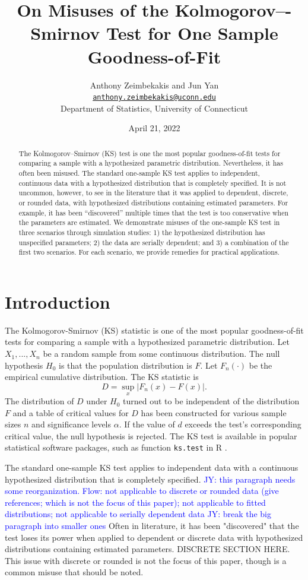 \documentclass[12pt, letterpaper, titlepage]{article}
\title{On Misuses of the Kolmogorov–-Smirnov Test for One Sample Goodness-of-Fit}
\author{Anthony Zeimbekakis and Jun Yan\\
\href{mailto:anthony.zeimbekakis@uconn.edu}{\nolinkurl{anthony.zeimbekakis@uconn.edu}}\\
Department of Statistics, University of Connecticut}
\date{April 21, 2022}
\newcommand{\jy}[1]{\textcolor{blue}{JY: #1}}
\begin{document}
\maketitle

\doublespace

\begin{abstract}
The Kolmogorov--Smirnov (KS) test is one the most popular goodness-of-fit tests 
for comparing a sample with a hypothesized parametric distribution. Nevertheless, 
it has often been misused. The standard one-sample KS test applies to independent, 
continuous data with a hypothesized distribution that is completely specified. 
It is not uncommon, however, to see in the literature that it was applied to 
dependent, discrete, or rounded data, with hypothesized distributions containing 
estimated parameters. For example, it has been ``discovered'' multiple times 
that the test is too conservative when the parameters are estimated. We 
demonstrate misuses of the one-sample KS test in three scenarios through 
simulation studies:
1) the hypothesized distribution has unspecified parameters;
2) the data are serially dependent; and
3) a combination of the first two scenarios.
For each scenario, we provide remedies for practical applications.
\end{abstract}

\section{Introduction}\label{sec:intro}

The Kolmogorov-Smirnov (KS) statistic is one of the most popular goodness-of-fit 
tests for comparing a sample with a hypothesized parametric distribution.
Let $X_1, ..., X_n$ be a random sample from some continuous distribution. 
The null hypothesis $H_0$ is that the population distribution is $F$.
Let $F_n(\cdot)$ be the empirical cumulative distribution. The KS statistic is
\[
  D = \sup_x {\lvert F_{n}(x) - F(x) \rvert}.
\]
The distribution of $D$ under $H_0$ turned out to be independent of the
distribution $F$ and a table of critical values for $D$ has been constructed
\citet{Massey} for various sample sizes $n$ and significance 
levels $\alpha$. If the value of $d$ exceeds the test's corresponding critical 
value, the null hypothesis is rejected. The KS test is available in popular 
statistical software packages, such as function \texttt{ks.test} in R 
\citep{R, Marsaglia}.

The standard one-sample KS test applies to independent data with a continuous
hypothesized distribution that is completely specified.
\jy{this paragraph needs some reorganization.
  Flow: not applicable to discrete or rounded data (give references; which is
  not the focus of this paper);
  not applicable to fitted distributions;
  not applicable to serially dependent data}
\jy{break the big paragraph into smaller ones}
Often in literature, it has been "discovered" that the test loses its power when 
applied to dependent or discrete data with hypothesized distributions containing 
estimated parameters. DISCRETE SECTION HERE. This issue with discrete or rounded
is not the focus of this paper, though is a common misuse that should be 
noted.
\end{document}

